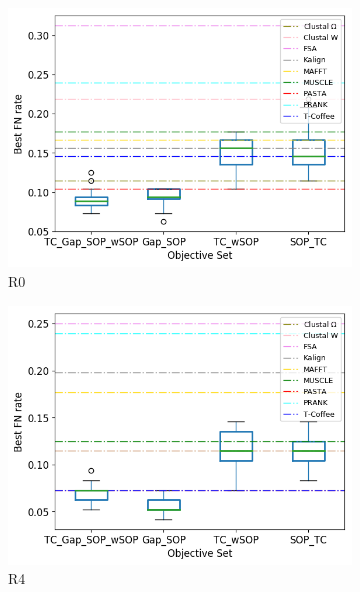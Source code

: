 \begin{figure}[!htbp]
	\centering
	\begin{subfigure}{0.32\textwidth}
		\includegraphics[width=\textwidth]{Figure/summary/precomputedInit/R0/objset_fnrate_rank}
		\caption{R0}
	\end{subfigure}	
	\begin{subfigure}{0.32\textwidth}
		\includegraphics[width=\columnwidth]{Figure/summary/precomputedInit/R4/objset_fnrate_rank}
		\caption{R4}
	\end{subfigure}
	\begin{subfigure}{0.32\textwidth}

\end{subfigure}
\end{figure}
